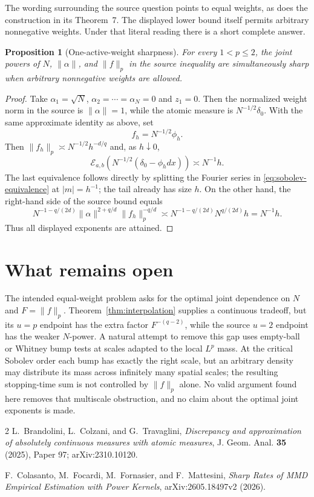 \documentclass[11pt]{article}
\newtheorem{proposition}{Proposition}
\newcommand{\Ecal}{\mathcal E}
\begin{document}
The wording surrounding the source question points to equal weights, as does
the construction in its Theorem~7.  The displayed lower bound itself permits
arbitrary nonnegative weights.  Under that literal reading there is a short
complete answer.

\begin{proposition}[One-active-weight sharpness]\label{prop:oneweight}
For every $1<p\le2$, the joint powers of $N$, $\|\alpha\|$, and
$\|f\|_p$ in the source inequality are simultaneously sharp when arbitrary
nonnegative weights are allowed.
\end{proposition}

\begin{proof}
Take $\alpha_1=\sqrt N$, $\alpha_2=\cdots=\alpha_N=0$ and
$z_1=0$.  Then the normalized weight norm in the source is
$\|\alpha\|=1$, while the atomic measure is
$N^{-1/2}\delta_0$.  With the same approximate identity as above, set
\[
 f_h=N^{-1/2}\phi_h.
\]
Then $\|f_h\|_p\asymp N^{-1/2}h^{-d/q}$ and, as $h\downarrow0$,
\[
 \Ecal_{a,b}(N^{-1/2}(\delta_0-\phi_hdx))\asymp N^{-1}h.
\]
The last equivalence follows directly by splitting the Fourier series in
\eqref{eq:sobolev-equivalence} at $|m|=h^{-1}$; the tail already has size
$h$.  On the other hand, the right-hand side of the source bound equals
\[
 N^{-1-q/(2d)}\|\alpha\|^{2+q/d}\|f_h\|_p^{-q/d}
 \asymp N^{-1-q/(2d)}N^{q/(2d)}h=N^{-1}h.
\]
Thus all displayed exponents are attained.
\end{proof}

\section{What remains open}

The intended equal-weight problem asks for the optimal joint dependence on
$N$ and $F=\|f\|_p$.  Theorem~\ref{thm:interpolation} supplies a continuous
tradeoff, but its $u=p$ endpoint has the extra factor $F^{-(q-2)}$, while the
source $u=2$ endpoint has the weaker $N$-power.  A natural attempt to remove
this gap uses empty-ball or Whitney bump tests at scales adapted to the local
$L^p$ mass.  At the critical Sobolev order each bump has exactly the right
scale, but an arbitrary density may distribute its mass across infinitely
many spatial scales; the resulting stopping-time sum is not controlled by
$\|f\|_p$ alone.  No valid argument found here removes that multiscale
obstruction, and no claim about the optimal joint exponents is made.

\begin{thebibliography}{2}
L.~Brandolini, L.~Colzani, and G.~Travaglini,
\emph{Discrepancy and approximation of absolutely continuous measures with
atomic measures}, J. Geom. Anal. \textbf{35} (2025), Paper 97;
arXiv:2310.10120.

F.~Colasanto, M.~Focardi, M.~Fornasier, and F.~Mattesini,
\emph{Sharp Rates of MMD Empirical Estimation with Power Kernels},
arXiv:2605.18497v2 (2026).
\end{thebibliography}
\end{document}
